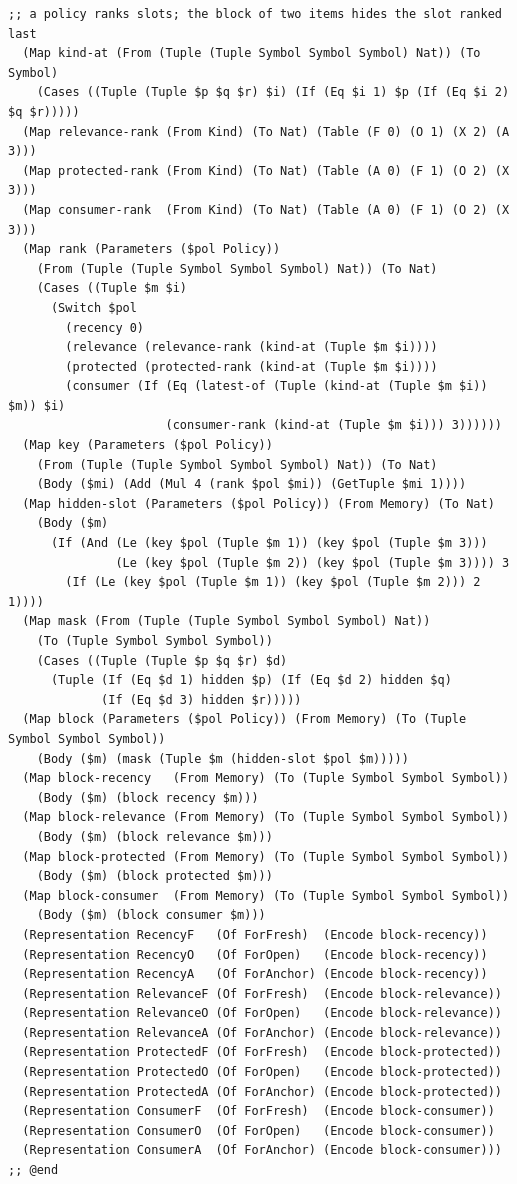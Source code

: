 \documentclass[11pt]{article}
\theoremstyle{definition}
\theoremstyle{plain}
\begin{document}
\begin{lstlisting}[style=mettafull]
  ;; a policy ranks slots; the block of two items hides the slot ranked last
  (Map kind-at (From (Tuple (Tuple Symbol Symbol Symbol) Nat)) (To Symbol)
    (Cases ((Tuple (Tuple $p $q $r) $i) (If (Eq $i 1) $p (If (Eq $i 2) $q $r)))))
  (Map relevance-rank (From Kind) (To Nat) (Table (F 0) (O 1) (X 2) (A 3)))
  (Map protected-rank (From Kind) (To Nat) (Table (A 0) (F 1) (O 2) (X 3)))
  (Map consumer-rank  (From Kind) (To Nat) (Table (A 0) (F 1) (O 2) (X 3)))
  (Map rank (Parameters ($pol Policy))
    (From (Tuple (Tuple Symbol Symbol Symbol) Nat)) (To Nat)
    (Cases ((Tuple $m $i)
      (Switch $pol
        (recency 0)
        (relevance (relevance-rank (kind-at (Tuple $m $i))))
        (protected (protected-rank (kind-at (Tuple $m $i))))
        (consumer (If (Eq (latest-of (Tuple (kind-at (Tuple $m $i)) $m)) $i)
                      (consumer-rank (kind-at (Tuple $m $i))) 3))))))
  (Map key (Parameters ($pol Policy))
    (From (Tuple (Tuple Symbol Symbol Symbol) Nat)) (To Nat)
    (Body ($mi) (Add (Mul 4 (rank $pol $mi)) (GetTuple $mi 1))))
  (Map hidden-slot (Parameters ($pol Policy)) (From Memory) (To Nat)
    (Body ($m)
      (If (And (Le (key $pol (Tuple $m 1)) (key $pol (Tuple $m 3)))
               (Le (key $pol (Tuple $m 2)) (key $pol (Tuple $m 3)))) 3
        (If (Le (key $pol (Tuple $m 1)) (key $pol (Tuple $m 2))) 2 1))))
  (Map mask (From (Tuple (Tuple Symbol Symbol Symbol) Nat))
    (To (Tuple Symbol Symbol Symbol))
    (Cases ((Tuple (Tuple $p $q $r) $d)
      (Tuple (If (Eq $d 1) hidden $p) (If (Eq $d 2) hidden $q)
             (If (Eq $d 3) hidden $r)))))
  (Map block (Parameters ($pol Policy)) (From Memory) (To (Tuple Symbol Symbol Symbol))
    (Body ($m) (mask (Tuple $m (hidden-slot $pol $m)))))
  (Map block-recency   (From Memory) (To (Tuple Symbol Symbol Symbol))
    (Body ($m) (block recency $m)))
  (Map block-relevance (From Memory) (To (Tuple Symbol Symbol Symbol))
    (Body ($m) (block relevance $m)))
  (Map block-protected (From Memory) (To (Tuple Symbol Symbol Symbol))
    (Body ($m) (block protected $m)))
  (Map block-consumer  (From Memory) (To (Tuple Symbol Symbol Symbol))
    (Body ($m) (block consumer $m)))
  (Representation RecencyF   (Of ForFresh)  (Encode block-recency))
  (Representation RecencyO   (Of ForOpen)   (Encode block-recency))
  (Representation RecencyA   (Of ForAnchor) (Encode block-recency))
  (Representation RelevanceF (Of ForFresh)  (Encode block-relevance))
  (Representation RelevanceO (Of ForOpen)   (Encode block-relevance))
  (Representation RelevanceA (Of ForAnchor) (Encode block-relevance))
  (Representation ProtectedF (Of ForFresh)  (Encode block-protected))
  (Representation ProtectedO (Of ForOpen)   (Encode block-protected))
  (Representation ProtectedA (Of ForAnchor) (Encode block-protected))
  (Representation ConsumerF  (Of ForFresh)  (Encode block-consumer))
  (Representation ConsumerO  (Of ForOpen)   (Encode block-consumer))
  (Representation ConsumerA  (Of ForAnchor) (Encode block-consumer)))
;; @end


\end{lstlisting}
\end{document}

